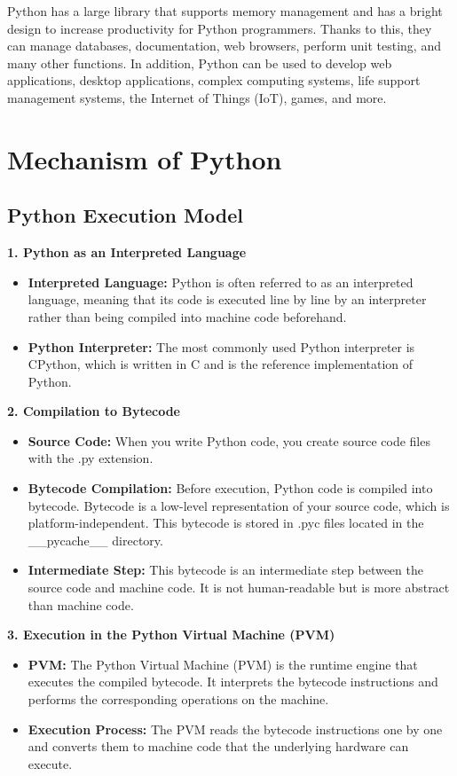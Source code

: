 \documentclass[12pt]{article}
\begin{document}
Python has a large library that supports memory management and has a bright design to increase productivity for Python programmers. Thanks to this, they can manage databases, documentation, web browsers, perform unit testing, and many other functions. In addition, Python can be used to develop web applications, desktop applications, complex computing systems, life support management systems, the Internet of Things (IoT), games, and more.

\section{Mechanism of Python}
\subsection{Python Execution Model}

\textbf{1. Python as an Interpreted Language}
\begin{itemize}
    \item \textbf{Interpreted Language:} Python is often referred to as an interpreted language, meaning that its code is executed line by line by an interpreter rather than being compiled into machine code beforehand.
    \item \textbf{Python Interpreter:} The most commonly used Python interpreter is CPython, which is written in C and is the reference implementation of Python.
\end{itemize}


\textbf{2. Compilation to Bytecode}
\begin{itemize}
    \item \textbf{Source Code:} When you write Python code, you create source code files with the .py extension.
    \item \textbf{Bytecode Compilation:} Before execution, Python code is compiled into bytecode. Bytecode is a low-level representation of your source code, which is platform-independent. This bytecode is stored in .pyc files located in the \_\_pycache\_\_ directory.

    \item \textbf{Intermediate Step:} This bytecode is an intermediate step between the source code and machine code. It is not human-readable but is more abstract than machine code.
\end{itemize}

\textbf{3. Execution in the Python Virtual Machine (PVM)}
\begin{itemize}
    \item \textbf{PVM:} The Python Virtual Machine (PVM) is the runtime engine that executes the compiled bytecode. It interprets the bytecode instructions and performs the corresponding operations on the machine.
    \item \textbf{Execution Process:} The PVM reads the bytecode instructions one by one and converts them to machine code that the underlying hardware can execute.
\end{itemize}
\end{document}
